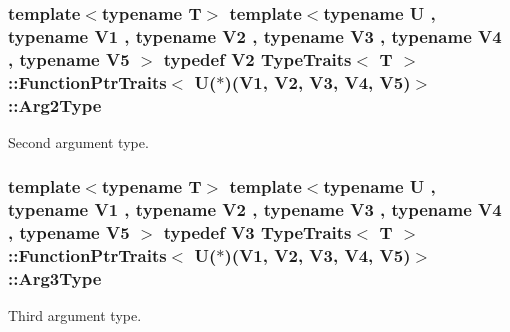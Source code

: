 \subsubsection[{\texorpdfstring{Arg2\+Type}{Arg2Type}}]{\setlength{\rightskip}{0pt plus 5cm}template$<$typename T$>$ template$<$typename U , typename V1 , typename V2 , typename V3 , typename V4 , typename V5 $>$ typedef V2 {\bf Type\+Traits}$<$ T $>$\+::{\bf Function\+Ptr\+Traits}$<$ U($\ast$)(V1, V2, V3, V4, V5)$>$\+::{\bf Arg2\+Type}}\hypertarget{structTypeTraits_1_1FunctionPtrTraits_3_01U_07_5_08_07V1_00_01V2_00_01V3_00_01V4_00_01V5_08_4_a580ca604714e02c1e2eabe15f553ef8e}{}\label{structTypeTraits_1_1FunctionPtrTraits_3_01U_07_5_08_07V1_00_01V2_00_01V3_00_01V4_00_01V5_08_4_a580ca604714e02c1e2eabe15f553ef8e}
Second argument type. 
\subsubsection[{\texorpdfstring{Arg3\+Type}{Arg3Type}}]{\setlength{\rightskip}{0pt plus 5cm}template$<$typename T$>$ template$<$typename U , typename V1 , typename V2 , typename V3 , typename V4 , typename V5 $>$ typedef V3 {\bf Type\+Traits}$<$ T $>$\+::{\bf Function\+Ptr\+Traits}$<$ U($\ast$)(V1, V2, V3, V4, V5)$>$\+::{\bf Arg3\+Type}}\hypertarget{structTypeTraits_1_1FunctionPtrTraits_3_01U_07_5_08_07V1_00_01V2_00_01V3_00_01V4_00_01V5_08_4_a74cb9f2aa12c24763b4e69f25bcd136c}{}\label{structTypeTraits_1_1FunctionPtrTraits_3_01U_07_5_08_07V1_00_01V2_00_01V3_00_01V4_00_01V5_08_4_a74cb9f2aa12c24763b4e69f25bcd136c}
Third argument type. 
